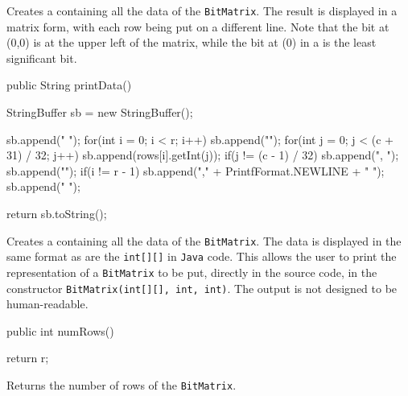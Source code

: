 \begin{tabb} Creates a  containing all the data of
  the \texttt{BitMatrix}. The result is displayed in a matrix form, with
  each row being put on a different line. Note that the bit at (0,0) is
  at the upper left of the matrix, while the bit at (0) in a
   is the least significant bit.
\end{tabb}
\begin{htmlonly}
\end{htmlonly}
\begin{code}

   public String printData() \begin{hide} {
      StringBuffer sb = new StringBuffer();

      sb.append("{ ");
      for(int i = 0; i < r; i++)
          {
              sb.append("{");
              for(int j = 0; j < (c + 31) / 32; j++)
                  {
                      sb.append(rows[i].getInt(j));
                      if(j != (c - 1) / 32)
                          sb.append(", ");
                  }
              sb.append("}");
              if(i != r - 1)
                  sb.append("," + PrintfFormat.NEWLINE + "  ");
          }
      sb.append(" }");

      return sb.toString();
   } \end{hide}
\end{code}
\begin{tabb} Creates a  containing all the data of
  the \texttt{BitMatrix}. The data is displayed in the same format as are the
  \texttt{int[][]} in \texttt{Java} code. This allows the user to print the
  representation of a \texttt{BitMatrix} to be put, directly in the source
  code, in the constructor \texttt{BitMatrix(int[][], int, int)}. The output
  is not designed to be human-readable.
\end{tabb}
\begin{htmlonly}
\end{htmlonly}
\begin{code}

   public int numRows() \begin{hide} {
      return r;
   } \end{hide}
\end{code}
\begin{tabb} Returns the number of rows of the \texttt{BitMatrix}.
\end{tabb}
